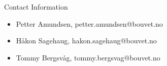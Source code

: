 \documentclass[final]{beamer}
\newlength{\onecolwid}
\begin{document}
\begin{frame}[t]
\begin{columns}[t]
\begin{column}{\onecolwid}
\begin{alertblock}{Contact Information}

\begin{itemize}
\item Petter Amundsen, petter.amundsen@bouvet.no
\item Håkon Sagehaug, hakon.sagehaug@bouvet.no
\item Tommy Bergsvåg, tommy.bergsvag@bouvet.no
\end{itemize}

\end{alertblock}


\end{column} %

\end{columns} %

\end{frame} %
\end{document}
